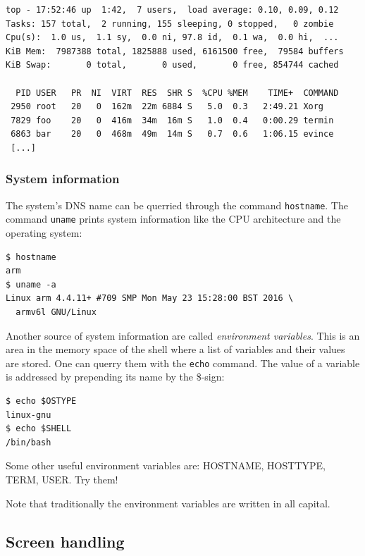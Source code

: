 \documentclass[11pt,a4paper,twoside]{article}
\begin{document}
\begin{lstlisting}[frame=single]
top - 17:52:46 up  1:42,  7 users,  load average: 0.10, 0.09, 0.12
Tasks: 157 total,  2 running, 155 sleeping, 0 stopped,   0 zombie
Cpu(s):  1.0 us,  1.1 sy,  0.0 ni, 97.8 id,  0.1 wa,  0.0 hi,  ...
KiB Mem:  7987388 total, 1825888 used, 6161500 free,  79584 buffers
KiB Swap:       0 total,       0 used,       0 free, 854744 cached

  PID USER   PR  NI  VIRT  RES  SHR S  %CPU %MEM    TIME+  COMMAND           
 2950 root   20   0  162m  22m 6884 S   5.0  0.3   2:49.21 Xorg              
 7829 foo    20   0  416m  34m  16m S   1.0  0.4   0:00.29 termin   
 6863 bar    20   0  468m  49m  14m S   0.7  0.6   1:06.15 evince            
 [...]
\end{lstlisting}


\subsubsection{System information}

The system's DNS name can be querried through the command \texttt{hostname}. 
The command \texttt{uname} prints system information like the CPU architecture 
and the operating system:

\begin{lstlisting}[frame=single]
$ hostname
arm
$ uname -a
Linux arm 4.4.11+ #709 SMP Mon May 23 15:28:00 BST 2016 \ 
  armv6l GNU/Linux
\end{lstlisting}

Another source of system information are called \emph{environment variables}.
This is an area in the memory space of the shell where a list of variables
and their values are stored. One can querry them with the \texttt{echo} 
command. The value of a variable is addressed by prepending its name by 
the \$-sign:

\begin{lstlisting}[frame=single]
$ echo $OSTYPE
linux-gnu
$ echo $SHELL
/bin/bash
\end{lstlisting}

Some other useful environment variables are: HOSTNAME, HOSTTYPE, TERM, 
USER. Try them! 

Note that traditionally the environment variables are written in all capital. 



\subsection{Screen handling}
\end{document}
